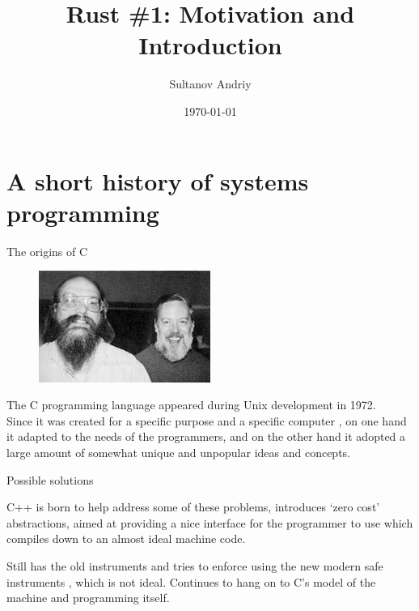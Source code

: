 \documentclass[usenames,dvipsnames,10pt,aspectratio=169]{beamer}
\title[Rust \#1]{Rust \#1: Motivation and Introduction}
\date[\today]{\small\today}
\author[Sultanov Andriy]{Sultanov Andriy}
\institute{APPS@UCU}
\begin{document}
\begin{frame}
\titlepage
\end{frame}

\begin{frame}{\contentsname}
\tableofcontents
\end{frame}


\section{A short history of systems programming}
\begin{frame}{The origins of C}

\begin{figure}
\centering
\includegraphics[width=0.5\textwidth]{graphics/ritchie.jpg}
\end{figure}
The C programming language appeared during Unix development in 1972.\\

Since it was created for a specific purpose %
and a specific computer %
, on one hand it adapted to the
needs of the programmers, and on the 
other hand it adopted a large
amount of somewhat unique and unpopular 
ideas and concepts.

\vskip 0.8cm

\end{frame}

\begin{frame}{Possible solutions}

C++ is born to help address some of these problems, 
introduces ‘zero cost’ abstractions, aimed 
at providing a nice interface for the 
programmer to use which compiles down to 
an almost ideal machine code. 

Still has the old instruments %
and tries to enforce using the new modern
safe instruments%
, which is not ideal. Continues to hang on 
to C’s model of the machine and programming itself.


\end{frame}
\end{document}
